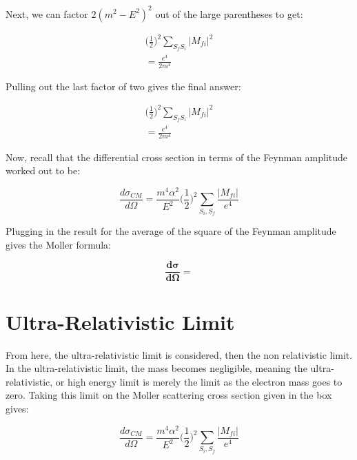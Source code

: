 \documentclass[a4]{article}
\begin{document}
    Next, we can factor $2 (m^2 - E^2)^2$ out of the large parentheses to get:

    \begin{eqnarray}
        \bigg( \frac{1}{2} \bigg)^2 \sum_{S_f S_i} |M_{f i}|^2 \\
        = \frac{e^4}{2 m^4}
    \end{eqnarray}

    Pulling out the last factor of two gives the final answer:

    \begin{eqnarray}
        \bigg( \frac{1}{2} \bigg)^2 \sum_{S_f S_i} |M_{f i}|^2 \\
        = \frac{e^4}{2 m^4}
    \end{eqnarray}

    Now, recall that the differential cross section in terms of the Feynman amplitude worked out to be:

    \begin{equation}
        \frac{d \sigma_{CM}}{d \Omega} = \frac{m^4 \alpha^2}{E^2} \bigg( \frac{1}{2} \bigg)^2 \sum_{S_i, S_f} \frac{|M_{fi}|}{e^4}
    \end{equation}

    Plugging in the result for the average of the square of the Feynman amplitude gives the Moller formula:

    \begin{framed}
        \begin{equation}
            \mathbf{\frac{d \sigma}{d \Omega} = }
        \end{equation}
    \end{framed}

    \section*{Ultra-Relativistic Limit}

    From here, the ultra-relativistic limit is considered, then the non relativistic limit. In the ultra-relativistic limit, the mass becomes negligible, meaning the ultra-relativistic, or high energy limit is merely the limit as the electron
    mass goes to zero. Taking this limit on the Moller scattering cross section given in the box gives:

    \begin{equation}
        \frac{d \sigma_{CM}}{d \Omega} = \frac{m^4 \alpha^2}{E^2} \bigg( \frac{1}{2} \bigg)^2 \sum_{S_i, S_f} \frac{|M_{fi}|}{e^4}
    \end{equation}
\end{document}
